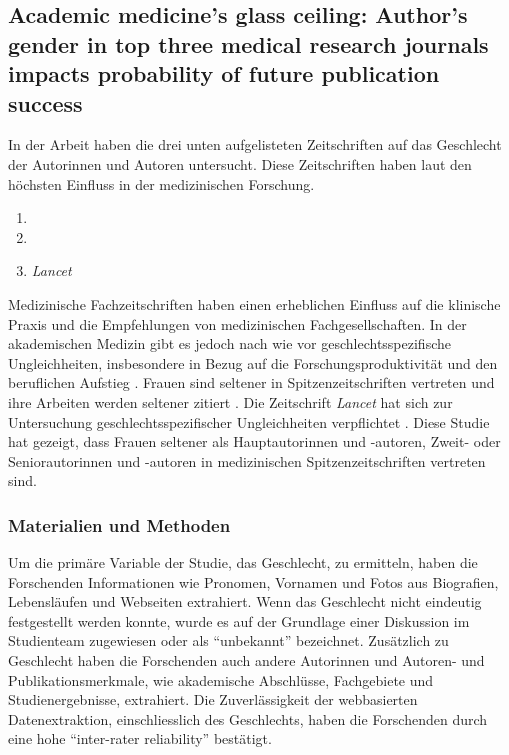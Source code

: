 \subsection{Academic medicine’s glass ceiling: Author’s gender in top three medical research journals impacts probability of future publication success}
In der Arbeit  \cite{academic_medicine_glass_ceiling} haben \citeauthor{academic_medicine_glass_ceiling}
die drei unten aufgelisteten Zeitschriften auf das Geschlecht der Autorinnen und Autoren untersucht.
Diese Zeitschriften haben laut \citeauthor{academic_medicine_glass_ceiling} den höchsten Einfluss in der medizinischen Forschung.
\begin{enumerate}
    \item {}
    \item {}
    \item \textsl{Lancet}
\end{enumerate}

Medizinische Fachzeitschriften haben einen erheblichen Einfluss auf die klinische Praxis und die Empfehlungen
von medizinischen Fachgesellschaften. 
In der akademischen Medizin gibt es jedoch nach wie vor geschlechtsspezifische Ungleichheiten, 
insbesondere in Bezug auf die Forschungsproduktivität und den beruflichen Aufstieg \cite{marcotte2021toward,alonso2021gender,chadwick2020gender}. 
Frauen sind seltener in Spitzenzeitschriften vertreten und ihre Arbeiten werden seltener zitiert \cite{benjamens2020gender,kramer2019sex,menzel2019gender}. 
Die Zeitschrift \textsl{Lancet} hat sich zur Untersuchung geschlechtsspezifischer Ungleichheiten verpflichtet \cite{schwalbe2018time}. 
Diese Studie hat gezeigt, dass Frauen seltener als Hauptautorinnen und -autoren, Zweit- oder Seniorautorinnen und -autoren 
in medizinischen Spitzenzeitschriften vertreten sind.

\subsubsection{Materialien und Methoden}
Um die primäre Variable der Studie, das Geschlecht, zu ermitteln, haben die Forschenden Informationen wie
Pronomen, Vornamen und Fotos aus Biografien, Lebensläufen und Webseiten extrahiert. 
Wenn das Geschlecht nicht eindeutig festgestellt werden konnte, wurde es auf der Grundlage einer Diskussion im Studienteam 
zugewiesen oder als \enquote{unbekannt} bezeichnet. 
Zusätzlich zu Geschlecht haben die Forschenden auch andere Autorinnen und Autoren- und Publikationsmerkmale, wie akademische Abschlüsse, 
Fachgebiete und Studienergebnisse, extrahiert. 
Die Zuverlässigkeit der webbasierten Datenextraktion, einschliesslich des Geschlechts, haben die Forschenden durch eine hohe  \enquote{inter-rater reliability} bestätigt.

